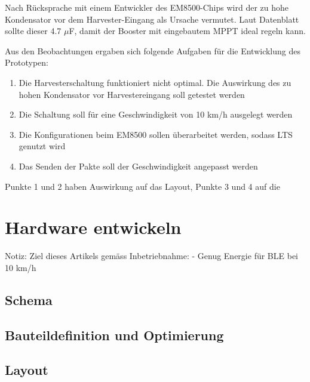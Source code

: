 Nach Rücksprache mit einem Entwickler des EM8500-Chips wird der zu hohe Kondensator vor dem Harvester-Eingang als Ursache vermutet. Laut Datenblatt sollte dieser 4.7 $\mu$F, damit der Booster mit eingebautem MPPT ideal regeln kann.


Aus den Beobachtungen ergaben sich folgende Aufgaben für die Entwicklung des Prototypen:

\begin{enumerate}
    \item Die Harvesterschaltung funktioniert nicht optimal. Die Auswirkung des zu hohen Kondensator vor Harvestereingang soll getestet werden
    \item Die Schaltung soll für eine Geschwindigkeit von 10 km/h ausgelegt werden
    \item Die Konfigurationen beim EM8500 sollen überarbeitet werden, sodass LTS genutzt wird
    \item Das Senden der Pakte soll der Geschwindigkeit angepasst werden
\end{enumerate}

Punkte 1 und 2 haben Auswirkung auf das Layout, Punkte 3 und 4 auf die 








\section{Hardware entwickeln}

Notiz: Ziel dieses Artikels gemäss Inbetriebnahme:
- Genug Energie für BLE bei 10 km/h
\subsection{Schema}
\subsection{Bauteildefinition und Optimierung}
\subsection{Layout}



